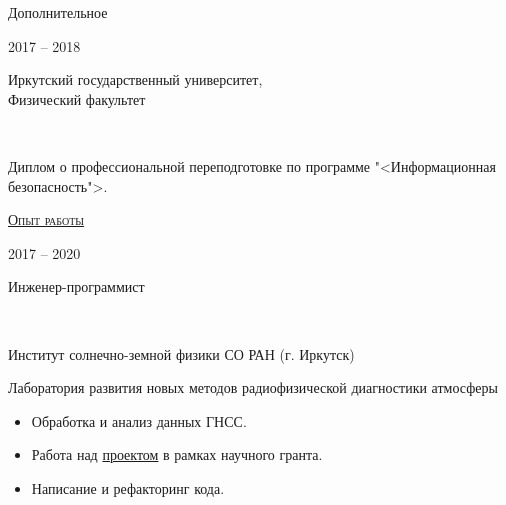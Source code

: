 \documentclass[10pt]{article}
\begin{document}
\vspace{2em}

\begin{bf}\begin{large}Дополнительное\end{large}\end{bf}

\vspace{1em}

\begin{minipage}[t]{0.14\linewidth}\begin{bf}2017 -- 2018\end{bf}\end{minipage}
\begin{minipage}[t]{0.84\linewidth}   
\begin{bf}
\begin{scshape}Иркутский государственный университет, \\ Физический факультет\end{scshape}
\end{bf} \\ [0.5em]
\begin{small}
Диплом о профессиональной переподготовке по программе "<Информационная безопасность">.
\end{small}
\end{minipage}

\vspace{2em}

\begin{bf}\begin{large}\uline{\scshape{Опыт работы}}\end{large}\end{bf}

\vspace{1em}

\begin{minipage}[t]{0.14\linewidth}\begin{bf}2017 -- 2020\end{bf}\end{minipage}
\begin{minipage}[t]{0.84\linewidth}   
\begin{bf}
\begin{scshape}Инженер-программист\end{scshape} \\ [0.5em]
\end{bf}
Институт солнечно-земной физики СО РАН (г. Иркутск) \\
\begin{itshape}Лаборатория развития новых методов радиофизической диагностики атмосферы \end{itshape}
\begin{small}
\begin{itemize}[leftmargin=*]
\item Обработка и анализ данных ГНСС.
\item Работа над \href{https://simurg.iszf.irk.ru}{проектом} в рамках научного гранта.
\item Написание и рефакторинг кода.
\end{itemize}
\end{small}
\end{minipage}
\end{document}
